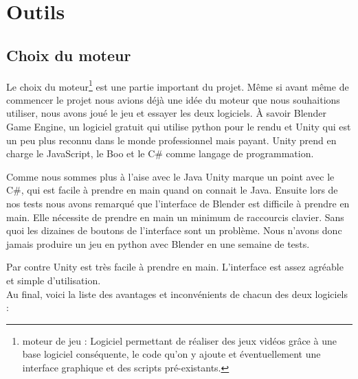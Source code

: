 \documentclass[a4paper,11pt]{myreport}
\begin{document}
\section{Outils}
\subsection{Choix du moteur}
\par Le choix du moteur\footnote{moteur de jeu : Logiciel permettant de réaliser des jeux vidéos grâce à une base logiciel conséquente, le code qu'on y ajoute et éventuellement une interface graphique et des scripts pré-existants.} est une partie important du projet. Même si avant même de commencer le projet nous avions déjà une idée du moteur que nous souhaitions utiliser, nous avons joué le jeu et essayer les deux logiciels. \`A savoir Blender Game Engine, un logiciel gratuit qui utilise python pour le rendu et Unity qui est un peu plus reconnu dans le monde professionnel mais payant. Unity prend en charge le JavaScript, le Boo et le C\# comme langage de programmation.

\par Comme nous sommes plus à l'aise avec le Java Unity marque un point avec le C\#, qui est facile à prendre en main quand on connait le Java. Ensuite lors de nos tests nous avons remarqué que l'interface de Blender est difficile à prendre en main. Elle nécessite de prendre en main un minimum de raccourcis clavier. Sans quoi les dizaines de boutons de l'interface sont un problème. Nous n'avons donc jamais produire un jeu en python avec Blender en une semaine de tests.
\par Par contre Unity est très facile à prendre en main. L'interface est assez agréable et simple d'utilisation.
\\Au final, voici la liste des avantages et inconvénients de chacun des deux logiciels :
\end{document}
